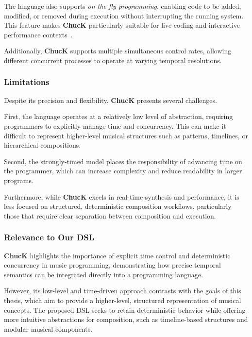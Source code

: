 The language also supports \textit{on-the-fly programming}, enabling code to be added, modified, or removed during
execution without interrupting the running system.
This feature makes \textbf{ChucK} particularly suitable for live coding and interactive performance
contexts~\cite{Wang_Cook_2003}.

Additionally, \textbf{ChucK} supports multiple simultaneous control rates, allowing different concurrent processes to
operate at varying temporal resolutions.


\subsubsection{Limitations}

Despite its precision and flexibility, \textbf{ChucK} presents several challenges.

First, the language operates at a relatively low level of abstraction, requiring programmers to explicitly manage time
and concurrency.
This can make it difficult to represent higher-level musical structures such as patterns, timelines, or hierarchical
compositions.

Second, the strongly-timed model places the responsibility of advancing time on the programmer, which can increase
complexity and reduce readability in larger programs.

Furthermore, while \textbf{ChucK} excels in real-time synthesis and performance, it is less focused on structured,
deterministic composition workflows, particularly those that require clear separation between composition and execution.


\subsubsection{Relevance to Our DSL}

\textbf{ChucK} highlights the importance of explicit time control and deterministic concurrency in music programming,
demonstrating how precise temporal semantics can be integrated directly into a programming language.

However, its low-level and time-driven approach contrasts with the goals of this thesis, which aim to provide a
higher-level, structured representation of musical concepts.
The proposed DSL seeks to retain deterministic behavior while offering more intuitive abstractions for composition, such
as timeline-based structures and modular musical components.

